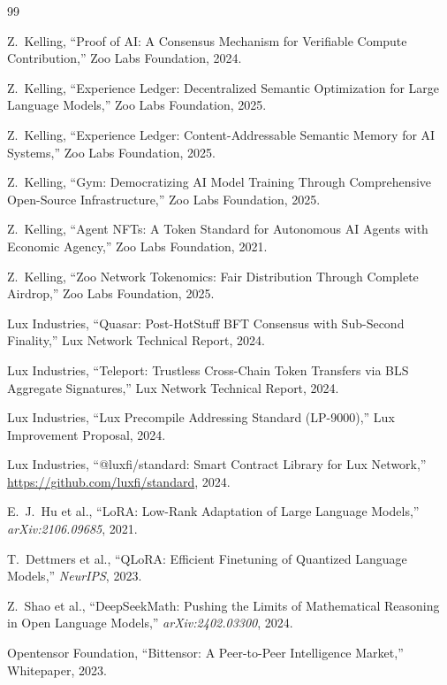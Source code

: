 \documentclass[11pt,letterpaper]{article}
\begin{document}
\begin{thebibliography}{99}

Z.~Kelling, ``Proof of AI: A Consensus Mechanism for Verifiable Compute Contribution,'' Zoo Labs Foundation, 2024.

Z.~Kelling, ``Experience Ledger: Decentralized Semantic Optimization for Large Language Models,'' Zoo Labs Foundation, 2025.

Z.~Kelling, ``Experience Ledger: Content-Addressable Semantic Memory for AI Systems,'' Zoo Labs Foundation, 2025.

Z.~Kelling, ``Gym: Democratizing AI Model Training Through Comprehensive Open-Source Infrastructure,'' Zoo Labs Foundation, 2025.

Z.~Kelling, ``Agent NFTs: A Token Standard for Autonomous AI Agents with Economic Agency,'' Zoo Labs Foundation, 2021.

Z.~Kelling, ``Zoo Network Tokenomics: Fair Distribution Through Complete Airdrop,'' Zoo Labs Foundation, 2025.

Lux Industries, ``Quasar: Post-HotStuff BFT Consensus with Sub-Second Finality,'' Lux Network Technical Report, 2024.

Lux Industries, ``Teleport: Trustless Cross-Chain Token Transfers via BLS Aggregate Signatures,'' Lux Network Technical Report, 2024.

Lux Industries, ``Lux Precompile Addressing Standard (LP-9000),'' Lux Improvement Proposal, 2024.

Lux Industries, ``@luxfi/standard: Smart Contract Library for Lux Network,'' \url{https://github.com/luxfi/standard}, 2024.

E.~J.~Hu et al., ``LoRA: Low-Rank Adaptation of Large Language Models,'' \textit{arXiv:2106.09685}, 2021.

T.~Dettmers et al., ``QLoRA: Efficient Finetuning of Quantized Language Models,'' \textit{NeurIPS}, 2023.

Z.~Shao et al., ``DeepSeekMath: Pushing the Limits of Mathematical Reasoning in Open Language Models,'' \textit{arXiv:2402.03300}, 2024.

Opentensor Foundation, ``Bittensor: A Peer-to-Peer Intelligence Market,'' Whitepaper, 2023.


\end{thebibliography}
\end{document}
